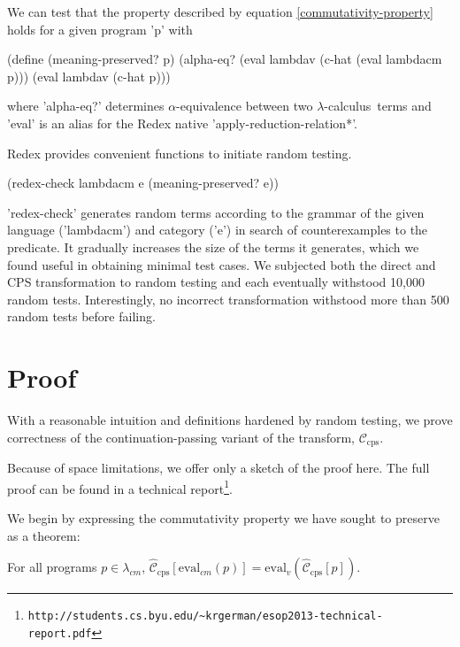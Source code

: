 \documentclass{llncs}
\newcommand{\lc}[0]{$\lambda$-calculus}
\newcommand{\Chcps}[1]{\hat{\mathcal{C}}_{\mathrm{cps}}[#1]}
\begin{document}
We can test that the property described by equation \ref{commutativity-property} holds for a given program \scheme'p' with 
\begin{schemedisplay}
(define (meaning-preserved? p)
  (alpha-eq? (eval lambdav (c-hat (eval lambdacm p))) (eval lambdav (c-hat p)))
\end{schemedisplay}
where \scheme'alpha-eq?' determines $\alpha$-equivalence between two \lc\ terms and \scheme'eval' is an alias for the Redex native \scheme'apply-reduction-relation*'.

Redex provides convenient functions to initiate random testing.

\begin{schemedisplay}
(redex-check lambdacm e (meaning-preserved? e))
\end{schemedisplay}

\scheme'redex-check' generates random terms according to the grammar of the given language (\scheme'lambdacm') and category (\scheme'e') in search of counterexamples to the predicate. It gradually increases the size of the terms it generates, which we found useful in obtaining minimal test cases. We subjected both the direct and CPS transformation to random testing and each eventually withstood 10,000 random tests. Interestingly, no incorrect transformation withstood more than 500 random tests before failing.

\section{Proof}
\label{sec-proof}

With a reasonable intuition and definitions hardened by random testing, we prove correctness of the continuation-passing variant of the transform, $\mathcal{C}_{\mathrm{cps}}$.

Because of space limitations, we offer only a sketch of the proof here. The full proof can be found in a technical report\footnote{\texttt{http://students.cs.byu.edu/\textasciitilde{}krgerman/esop2013-technical-report.pdf}}.

We begin by expressing the commutativity property we have sought to preserve as a theorem:

\begin{theorem}
For all programs $p\in\lambda_{cm}$, $\Chcps{\mathrm{eval}_{cm}(p)}=\mathrm{eval}_{v}(\Chcps{p})$.
\end{theorem}
\end{document}

